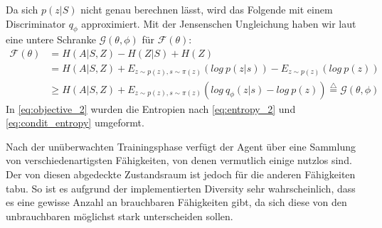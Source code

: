 Da sich $ p(z|S) $ nicht genau berechnen lässt, wird das Folgende mit einem Discriminator $ q_\phi $ approximiert. Mit der Jensenschen Ungleichung haben wir laut \cite{diversity_eysenbach} eine untere Schranke $ \mathcal{G}(\theta, \phi) $ für $ \mathcal{F}(\theta) $:
\begin{align}
    \mathcal{F}(\theta) & = H(A|S,Z) - H(Z|S) + H(Z) \nonumber\\
    & = H(A|S,Z) + E_{z \sim p(z), s \sim \pi(z)}(log\ p(z | s)) - E_{z \sim p(z)}(log\ p(z)) \label{eq:objective_2}\\
    & \ge H(A|S,Z) + E_{z \sim p(z), s \sim \pi(z)}(log\ q_\phi(z | s) - log\ p(z)) \stackrel{\triangle}{=} \mathcal{G}(\theta, \phi) \nonumber
\end{align}
In \eqref{eq:objective_2} wurden die Entropien nach \eqref{eq:entropy_2} und \eqref{eq:condit_entropy} umgeformt.

\smallspace

Nach der unüberwachten Trainingsphase verfügt der Agent über eine Sammlung von verschiedenartigsten Fähigkeiten, von denen vermutlich einige nutzlos sind. Der von diesen abgedeckte Zustandsraum ist jedoch für die anderen Fähigkeiten tabu. So ist es aufgrund der implementierten Diversity sehr wahrscheinlich, dass es eine gewisse Anzahl an brauchbaren Fähigkeiten gibt, da sich diese von den unbrauchbaren möglichst stark unterscheiden sollen.

